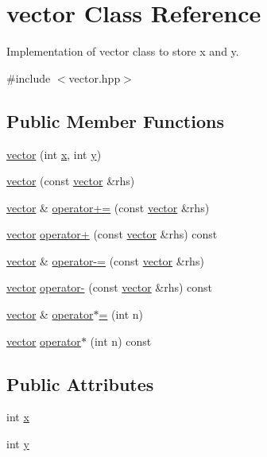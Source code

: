 \hypertarget{classvector}{}\section{vector Class Reference}
\label{classvector}


Implementation of vector class to store x and y.  




{\ttfamily \#include $<$vector.\+hpp$>$}

\subsection*{Public Member Functions}
\begin{DoxyCompactItemize}
\item 
\hyperlink{classvector_a7fa147d3199381b9d8b32753bd1a6968}{vector} (int \hyperlink{classvector_a0403eb3aea23a3009e276fba1d317046}{x}, int \hyperlink{classvector_aad6de640298eae97ca0a094db5aff477}{y})
\item 
\hyperlink{classvector_a829904aef4f1a78fc3c52ef7c857f8f4}{vector} (const \hyperlink{classvector}{vector} \&rhs)
\item 
\hyperlink{classvector}{vector} \& \hyperlink{classvector_acf4c6a4d343c92e211f80de7712a3cac}{operator+=} (const \hyperlink{classvector}{vector} \&rhs)
\item 
\hyperlink{classvector}{vector} \hyperlink{classvector_a2ab7f62262c6f0c6ade3bd1879e6001e}{operator+} (const \hyperlink{classvector}{vector} \&rhs) const 
\item 
\hyperlink{classvector}{vector} \& \hyperlink{classvector_a9f6cf8d24ca60a5bec617c364172d89f}{operator-\/=} (const \hyperlink{classvector}{vector} \&rhs)
\item 
\hyperlink{classvector}{vector} \hyperlink{classvector_ad9596a53b6aef33bbddfa7b9b4b17f09}{operator-\/} (const \hyperlink{classvector}{vector} \&rhs) const 
\item 
\hyperlink{classvector}{vector} \& \hyperlink{classvector_a6adc3766a4afa03340fa2a94d6d81a00}{operator$\ast$=} (int n)
\item 
\hyperlink{classvector}{vector} \hyperlink{classvector_ac69d5833c619427c28a8fb120d30b5c8}{operator$\ast$} (int n) const 
\end{DoxyCompactItemize}
\subsection*{Public Attributes}
\begin{DoxyCompactItemize}
\item 
int \hyperlink{classvector_a0403eb3aea23a3009e276fba1d317046}{x}
\item 
int \hyperlink{classvector_aad6de640298eae97ca0a094db5aff477}{y}
\end{DoxyCompactItemize}


